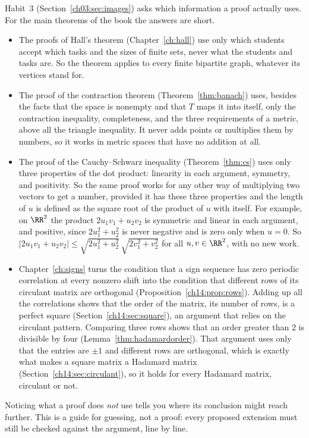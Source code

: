 Habit~3 (Section~\ref{ch03:sec:images}) asks which information a proof actually uses. For the main theorems of the book the answers are short.
\begin{itemize}
\item The proofs of Hall's theorem (Chapter~\ref{ch:hall}) use only which students accept which tasks and the sizes of finite sets, never what the students and tasks are. So the theorem applies to every finite bipartite graph, whatever its vertices stand for.
\item The proof of the contraction theorem (Theorem~\ref{thm:banach}) uses, besides the facts that the space is nonempty and that $T$ maps it into itself, only the contraction inequality, completeness, and the three requirements of a metric, above all the triangle inequality. It never adds points or multiplies them by numbers, so it works in metric spaces that have no addition at all.
\item The proof of the Cauchy--Schwarz inequality (Theorem~\ref{thm:cs}) uses only three properties of the dot product: linearity in each argument, symmetry, and positivity. So the same proof works for any other way of multiplying two vectors to get a number, provided it has these three properties and the length of $u$ is defined as the square root of the product of $u$ with itself. For example, on $\RR^2$ the product $2u_1v_1+u_2v_2$ is symmetric and linear in each argument, and positive, since $2u_1^2+u_2^2$ is never negative and is zero only when $u=0$. So $|2u_1v_1+u_2v_2|\le\sqrt{2u_1^2+u_2^2}\,\sqrt{2v_1^2+v_2^2}$ for all $u,v\in\RR^2$, with no new work.
\item Chapter~\ref{ch:signs} turns the condition that a sign sequence has zero periodic correlation at every nonzero shift into the condition that different rows of its circulant matrix are orthogonal (Proposition~\ref{ch14:prop:rows}). Adding up all the correlations shows that the order of the matrix, its number of rows, is a perfect square (Section~\ref{ch14:sec:square}), an argument that relies on the circulant pattern. Comparing three rows shows that an order greater than $2$ is divisible by four (Lemma~\ref{thm:hadamardorder}). That argument uses only that the entries are $\pm1$ and different rows are orthogonal, which is exactly what makes a square matrix a Hadamard matrix (Section~\ref{ch14:sec:circulant}), so it holds for every Hadamard matrix, circulant or not.
\end{itemize}
Noticing what a proof does \emph{not} use tells you where its conclusion might reach further. This is a guide for guessing, not a proof: every proposed extension must still be checked against the argument, line by line.

